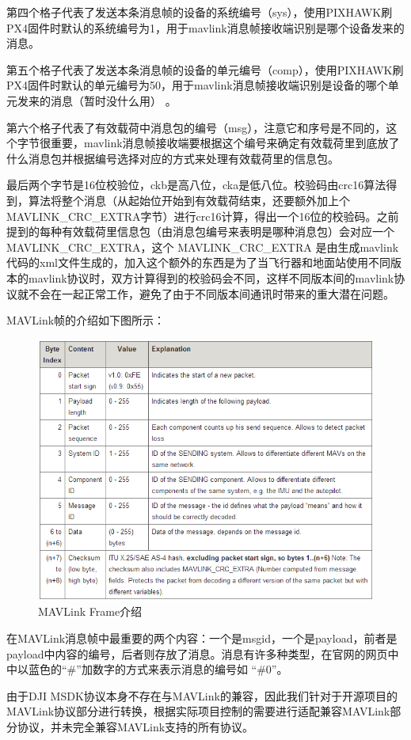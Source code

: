 第四个格子代表了发送本条消息帧的设备的系统编号（sys），使用PIXHAWK刷PX4固件时默认的系统编号为1，用于mavlink消息帧接收端识别是哪个设备发来的消息。

第五个格子代表了发送本条消息帧的设备的单元编号（comp），使用PIXHAWK刷PX4固件时默认的单元编号为50，用于mavlink消息帧接收端识别是设备的哪个单元发来的消息（暂时没什么用） 。

第六个格子代表了有效载荷中消息包的编号（msg），注意它和序号是不同的，这个字节很重要，mavlink消息帧接收端要根据这个编号来确定有效载荷里到底放了什么消息包并根据编号选择对应的方式来处理有效载荷里的信息包。

最后两个字节是16位校验位，ckb是高八位，cka是低八位。校验码由crc16算法得到，算法将整个消息（从起始位开始到有效载荷结束，还要额外加上个MAVLINK_CRC_EXTRA字节）进行crc16计算，得出一个16位的校验码。之前提到的每种有效载荷里信息包（由消息包编号来表明是哪种消息包）会对应一个MAVLINK_CRC_EXTRA，这个 MAVLINK_CRC_EXTRA 是由生成mavlink代码的xml文件生成的，加入这个额外的东西是为了当飞行器和地面站使用不同版本的mavlink协议时，双方计算得到的校验码会不同，这样不同版本间的mavlink协议就不会在一起正常工作，避免了由于不同版本间通讯时带来的重大潜在问题。

MAVLink帧的介绍如下图所示：

\begin{figure}[ht]
  \centering
  \includegraphics[width=0.8\linewidth]{./Figure/Mavlink_Frame_Intro.png}
  \caption{MAVLink Frame介绍}\label{Fig:xd1}
\end{figure}

在MAVLink消息帧中最重要的两个内容：一个是msgid，一个是payload，前者是payload中内容的编号，后者则存放了消息。消息有许多种类型，在官网的网页中中以蓝色的“#”加数字的方式来表示消息的编号如 “\#0”。

由于DJI MSDK协议本身不存在与MAVLink的兼容，因此我们针对于开源项目的MAVLink协议部分进行转换，根据实际项目控制的需要进行适配兼容MAVLink部分协议，并未完全兼容MAVLink支持的所有协议。

